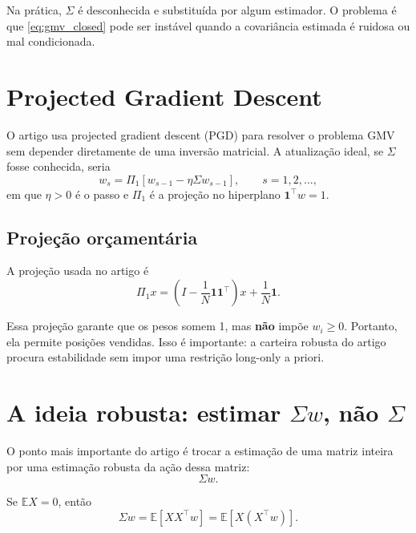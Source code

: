\documentclass[12pt,a4paper]{article}
\newcommand{\E}{\mathbb{E}}
\newcommand{\one}{\mathbf{1}}
\begin{document}
Na prática, $\Sigma$ é desconhecida e substituída por algum estimador. O problema é que
\eqref{eq:gmv_closed} pode ser instável quando a covariância estimada é ruidosa ou mal
condicionada.

\section{Projected Gradient Descent}

O artigo usa projected gradient descent (PGD) para resolver o problema GMV sem depender
diretamente de uma inversão matricial. A atualização ideal, se $\Sigma$ fosse conhecida, seria
\begin{equation}
  w_s
  =
  \Pi_1\left[
    w_{s-1} - \eta \Sigma w_{s-1}
  \right],
  \qquad s=1,2,\dots,
  \label{eq:pgd}
\end{equation}
em que $\eta>0$ é o passo e $\Pi_1$ é a projeção no hiperplano $\one^\top w = 1$.

\subsection{Projeção orçamentária}

A projeção usada no artigo é
\begin{equation}
  \Pi_1 x
  =
  \left(I - \frac{1}{N}\one\one^\top\right)x
  +
  \frac{1}{N}\one.
  \label{eq:proj_budget}
\end{equation}

Essa projeção garante que os pesos somem 1, mas \textbf{não} impõe $w_i \ge 0$. Portanto,
ela permite posições vendidas. Isso é importante: a carteira robusta do artigo procura
estabilidade sem impor uma restrição long-only a priori.

\section{\texorpdfstring{A ideia robusta: estimar $\Sigma w$, não $\Sigma$}{A ideia robusta: estimar Sigma w, nao Sigma}}

O ponto mais importante do artigo é trocar a estimação de uma matriz inteira por uma
estimação robusta da ação dessa matriz:
\begin{equation}
  \Sigma w.
\end{equation}

Se $\E X = 0$, então
\begin{equation}
  \Sigma w
  =
  \E\left[XX^\top w\right]
  =
  \E\left[X(X^\top w)\right].
  \label{eq:sigma_action}
\end{equation}
\end{document}
